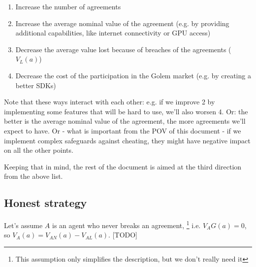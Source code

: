 \documentclass{article}
\begin{document}
\begin{enumerate}
\item Increase the number of agreements
\item Increase the average nominal value of the agreement (e.g. by providing additional capabilities, like internet connectivity or GPU access)
\item Decrease the average value lost because of breaches of the agreements ($V_L(a)$)
\item Decrease the cost of the participation in the Golem market (e.g. by creating a better SDKs)
\end{enumerate}

Note that these ways interact with each other: e.g. if we improve 2 by implementing some features that will be hard to use, we'll also worsen 4.
Or: the better is the average nominal value of the agreement, the more agreements we'll expect to have.
Or - what is important from the POV of this document - if we implement complex safeguards against cheating, they might have negative impact on all the other points.

Keeping that in mind, the rest of the document is aimed at the third direction from the above list.

\subsection{Honest strategy}

Let's assume $A$ is an agent who never breaks an agreement, \footnote{This assumption only simplifies the description, but we don't really need it}
i.e.  $V_AG(a) = 0$, so $V_A(a) = V_{AN}(a) - V_{AL}(a)$. [TODO]

% 
% 
% 
% 
\end{document}
